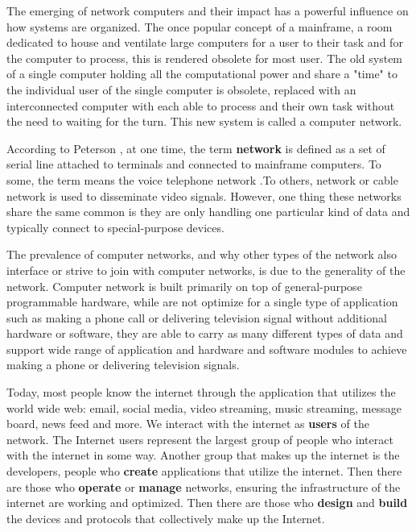 The emerging of network computers and their impact has a powerful influence on how systems are organized. The once popular concept of a mainframe, a room dedicated to house and ventilate large computers for a user to their task and for the computer to process, this is rendered obsolete for most user. The old system of a single computer holding all the computational power and share a "time" to the individual user of the single computer is obsolete, replaced with an interconnected computer with each able to process and their own task without the need to waiting for the turn. This new system is called a computer network.

According to Peterson \cite{peterson2012computer}, at one time, the term \textbf{network} is defined as a set of serial line attached to terminals and connected to mainframe computers. To some, the term means the voice telephone network .To others, network or cable network is used to disseminate video signals. However, one thing these networks share the same common is they are only handling one particular kind of data and typically connect to special-purpose devices.%

The prevalence of computer networks, and why other types of the network also interface or strive to join with computer networks, is due to the generality of the network. Computer network is built primarily on top of general-purpose programmable hardware, while are not optimize for a single type of application such as making a phone call or delivering television signal without additional hardware or software,  they are able to carry as many different types of data and support wide range of application and hardware and software modules to achieve making a phone or delivering television signals. 

Today, most people know the internet through the application that utilizes the world wide web: email, social media, video streaming, music streaming, message board, news feed and more. We interact with the internet as \textbf{users} of the network. The Internet users represent the largest group of people who interact with the internet in some way. Another group that makes up the internet is the developers, people who \textbf{create} applications that utilize the internet. Then there are those who \textbf{operate} or \textbf{manage} networks, ensuring the infrastructure of the internet are working and optimized. Then there are those who \textbf{design} and \textbf{build} the devices and protocols that collectively make up the Internet.

